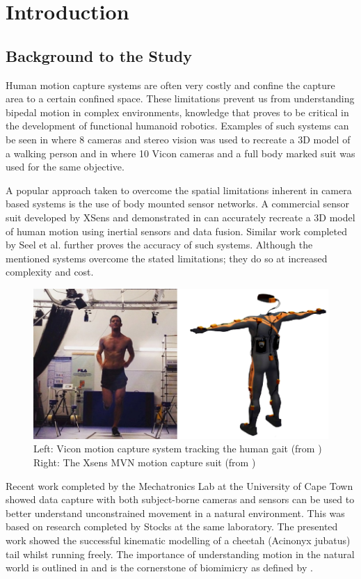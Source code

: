 \chapter{Introduction}

\section{Background to the Study}
Human motion capture systems are often very costly and confine the capture area to a certain confined space. These limitations prevent us from understanding bipedal motion in complex environments, knowledge that proves to be critical in the development of functional humanoid robotics. Examples of such systems can be seen in \cite{sandau2014markerless} where 8 cameras and stereo vision was used to recreate a 3D model of a walking person and in \cite{pfister2014comparative} where 10 Vicon cameras and a full body marked suit was used for the same objective.

A popular approach taken to overcome the spatial limitations inherent in camera based systems is the use of body mounted sensor networks. A commercial sensor suit developed by XSens and demonstrated in \cite{roetenberg2009xsens} can accurately recreate a 3D model of human motion using inertial sensors and data fusion. Similar work completed by Seel et al. \cite{seel2014imu} further proves the accuracy of such systems. Although the mentioned systems overcome the stated limitations; they do so at increased complexity and cost.

\begin{figure}[!ht] 
\captionsetup{width=0.8\linewidth, font=small}  
\includegraphics[width=0.8\linewidth]{figures/COMBO.png}
\caption{Left: Vicon motion capture system tracking the human gait (from 				\cite{roetenberg2009xsens}) Right: The Xsens MVN motion capture suit (from \cite{vicon})}
\label{fig:COMBO}
\end{figure}

Recent work \cite{patel2017trackingieee} completed by the Mechatronics Lab at the University of Cape Town showed data capture with both subject-borne cameras and sensors can be used to better understand unconstrained movement in a natural environment. This was based on research completed by Stocks \cite{bradstocks} at the same laboratory. The presented work showed the successful kinematic modelling of a cheetah (Acinonyx jubatus) tail whilst running freely. The importance of understanding motion in the natural world is outlined in \cite{patel2014rapid} and is the cornerstone of biomimicry as defined by \cite{benyus2002biomimicry}.

